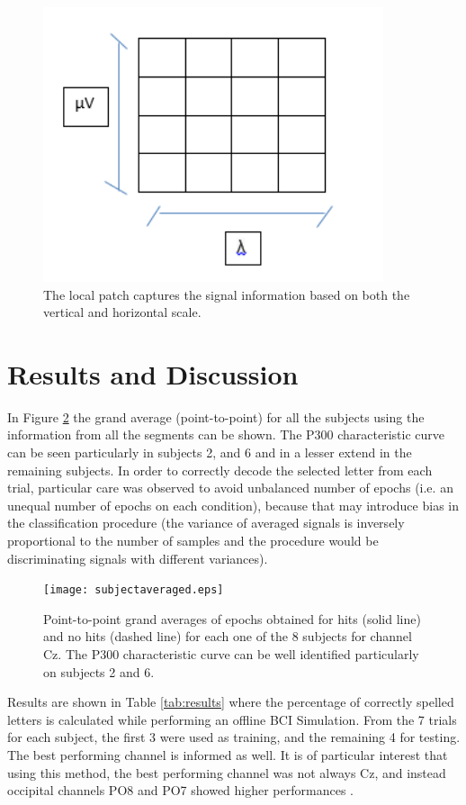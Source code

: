 \documentclass[entropy,article,submit,moreauthors,pdftex,10pt,a4paper]{mdpi}
\begin{document}
\begin{figure}[H]
\centering
\includegraphics[width=10cm]{localpatch.png}
\caption{The local patch captures the signal information based on both the vertical and horizontal scale.}
\label{fig:sampledescriptor2}
\end{figure}

\section{Results and Discussion} \label{Results}
\label{section:results}
In Figure \ref{fig:subjectaveraged} the grand average (point-to-point) for all the subjects using the information from all the segments can be shown.  The P300 characteristic curve can be seen particularly in subjects 2, and 6 and in a lesser extend in the remaining subjects. In order to correctly decode the selected letter from each trial, particular care was observed to avoid unbalanced number of epochs  (i.e. an unequal number of epochs on each condition), because that may introduce bias in the classification procedure (the variance of averaged signals is inversely proportional to the number of samples and the procedure would be discriminating signals with different variances).  

\begin{figure}[H]
\centering
\texttt{[image: subjectaveraged.eps]}
\caption{Point-to-point grand averages of epochs obtained for hits (solid line) and no hits (dashed line) for each one of the 8 subjects for channel Cz. The P300 characteristic curve can be well identified particularly on subjects 2 and 6.}
\label{fig:subjectaveraged}
\end{figure}

Results are shown in Table \ref{tab:results} where the percentage of correctly spelled letters is calculated while performing an offline BCI Simulation.  From the 7 trials for each subject, the first 3 were used as training, and the remaining 4 for testing.  The best performing channel is informed as well.  It is of particular interest that using this method, the best performing channel was not always Cz, and instead occipital channels PO8 and PO7 showed higher performances \citep{Huggins2016,Jure2016}.
\end{document}
